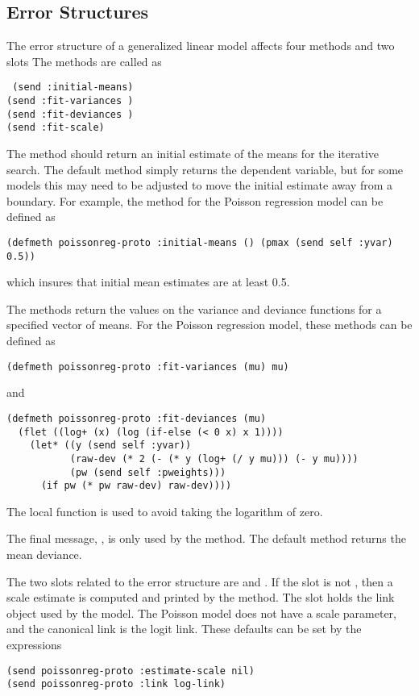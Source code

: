 \subsection{Error Structures}
The error structure of a generalized linear model affects four methods
and two slots The methods are called as
\begin{flushleft}\tt
(send  :initial-means)\\
(send  :fit-variances )\\
(send  :fit-deviances  )\\
(send  :fit-scale)
\end{flushleft}
The  method should return an initial estimate of
the means for the iterative search. The default method simply returns
the dependent variable, but for some models this may need to be
adjusted to move the initial estimate away from a boundary. For
example, the method for the Poisson regression model can be defined as
\begin{verbatim}
(defmeth poissonreg-proto :initial-means () (pmax (send self :yvar) 0.5))
\end{verbatim}
which insures that initial mean estimates are at least 0.5.

The   methods return the
values on the variance and deviance functions for a specified vector
of means. For the Poisson regression model, these methods can be
defined as
\begin{verbatim}
(defmeth poissonreg-proto :fit-variances (mu) mu)
\end{verbatim}
and
\begin{verbatim}
(defmeth poissonreg-proto :fit-deviances (mu)
  (flet ((log+ (x) (log (if-else (< 0 x) x 1))))
    (let* ((y (send self :yvar))
           (raw-dev (* 2 (- (* y (log+ (/ y mu))) (- y mu))))
           (pw (send self :pweights)))
      (if pw (* pw raw-dev) raw-dev))))
\end{verbatim}
The local function  is used to avoid taking the logarithm
of zero.

The final message, , is only used by the
 method. The default method returns the mean deviance.

The two slots related to the error structure are
 and . If the 
slot is not , then a scale estimate is computed and printed
by the  method. The  slot holds the link
object used by the model. The Poisson model does not have a scale
parameter, and the canonical link is the logit link. These defaults can
be set by the expressions
\begin{verbatim}
(send poissonreg-proto :estimate-scale nil)
(send poissonreg-proto :link log-link)
\end{verbatim}

